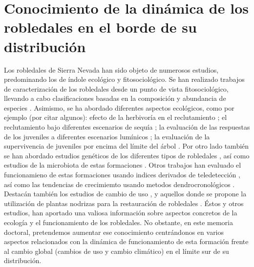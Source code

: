 \section{Conocimiento de la dinámica de los robledales en el borde de su distribución}\label{sec:intro:conocimiento}

Los robledales de Sierra Nevada han sido objeto de numerosos estudios, predominando los de índole ecológico y fitosociológico. Se han realizado trabajos de caracterización de los robledales desde un punto de vista fitosociológico, llevando a cabo clasificaciones basadas en la composición y abundancia de especies \autocites[\emph{e.g.}][]{MartinezParrasMoleroMesa1982EcologiaFitosociologia,Loriteetal2008PhytosociologicalReview, MelendoValle2000EstudioComparativo}. Asimismo, se ha abordado diferentes aspectos ecológicos, como por ejemplo (por citar algunos): efecto de la herbivoría en el reclutamiento \autocites[\emph{e.g.}][]{Gomez2003ImpactVertebrate,Barazaetal2004HerbivoryHas,Barazaetal2007InfluenciaCaracteristicas}; el reclutamiento bajo diferentes escenarios de sequía \autocites{Mendozaetal2009SeedingExperiment}; la evaluación de las respuestas de los juveniles a diferentes escenarios lumínicos \autocite{GomezAparicioetal2008OakSeedling}; la evaluación de la supervivencia de juveniles por encima del límite del árbol \autocites{Leverkusetal2015RestoringPresent}. Por otro lado también se han abordado estudios genéticos de los diferentes tipos de robledales \autocites[\emph{e.g.}][]{ValbuenaCarabanaGil2011EvaluacionEstructura,ValbuenaCarabanaGil2013GeneticResilience,ValbuenaCarabanaGil2017CentenaryCoppicing}, así como estudios de la microbiota de estas formaciones \autocites{CoboDiazetal2017TaxonomicFunctional,Lasaetal2019BacteriaEndosphere, Lasaetal2019MetabarcodingReveals}. Otros trabajos han evaluado el funcionamieno de estas formaciones usando indices derivados de teledetección \autocites{Dionisioetal2012SatelliteBasedMonitoring,AlcarazSeguraetal2015CambiosProductividad,RequenaMulloretal2018AssessmentEcosystem}, así como las tendencias de crecimiemto usando metodos dendrocronológicos  \autocites{GeaIzquierdoCanellas2014LocalClimate,RubioCuadradoetal2018AbioticFactors}. Destacán también los estudios de cambio de uso \autocite{JimenezOlivenciaetal2015EvolucionUsos,CamachoOlmedoetal2002DinamicaEvolutiva}, y aquellos donde se propone la utilización de plantas nodrizas para la restauración de robledales \autocites{Castroetal2006RestoringQuercus,GomezAparicioetal2004ApplyingPlant}. 
Éstos y otros estudios, han aportado una valiosa información sobre aspectos concretos de la ecología y el funcionamiento de los robledales. No obstante, en este memoria doctoral, pretendemos aumentar ese conocimiento centrándonos en varios aspectos relacionados con la dinámica de funcionamiento de esta formación frente al cambio global (cambios de uso y cambio climático) en el límite sur de su distribución.    

